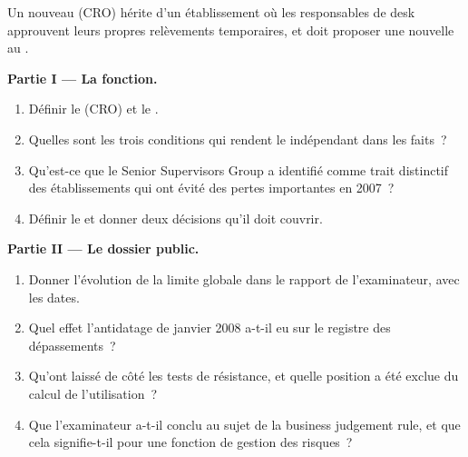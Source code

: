 \begin{problem}\label{pb:fm:the-risk-management-function:1}
Un nouveau  (CRO) hérite d'un établissement où les responsables de desk approuvent leurs propres relèvements temporaires, et doit proposer une
nouvelle  au .

\medskip\noindent\textbf{Partie I --- La fonction.}
\begin{enumerate}
\item Définir le  (CRO) et le .
\item Quelles sont les trois conditions qui rendent le  indépendant dans les faits~?
\item Qu'est-ce que le Senior Supervisors Group a identifié comme trait distinctif des établissements qui ont évité des pertes importantes en 2007~?
\item Définir le  et donner deux décisions qu'il doit couvrir.
\end{enumerate}

\medskip\noindent\textbf{Partie II --- Le dossier public.}
\begin{enumerate}[resume]
\item Donner l'évolution de la limite globale dans le rapport de l'examinateur, avec les dates.
\item Quel effet l'antidatage de janvier 2008 a-t-il eu sur le registre des dépassements~?
\item Qu'ont laissé de côté les tests de résistance, et quelle position a été exclue du calcul de l'utilisation~?
\item Que l'examinateur a-t-il conclu au sujet de la business judgement rule, et que cela signifie-t-il pour une fonction de gestion des risques~?
\end{enumerate}


\end{problem}
